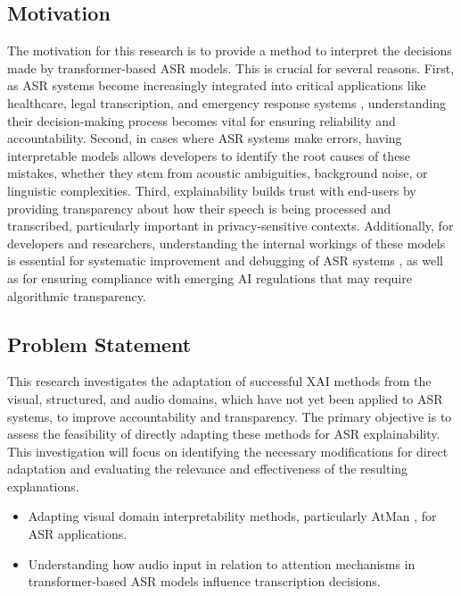 \documentclass[../report.tex]{subfiles}
\begin{document}
    \subsection{Motivation}
    \label{sec:introduction:motivation}

    The motivation for this research is to provide a method to interpret the decisions made by transformer-based ASR models. This is crucial for several reasons. First, as ASR systems become increasingly integrated into critical applications like healthcare, legal transcription, and emergency response systems \cite{doi:10.34133/icomputing.0074}, understanding their decision-making process becomes vital for ensuring reliability and accountability. Second, in cases where ASR systems make errors, having interpretable models allows developers to identify the root causes of these mistakes, whether they stem from acoustic ambiguities, background noise, or linguistic complexities. Third, explainability builds trust with end-users by providing transparency about how their speech is being processed and transcribed, particularly important in privacy-sensitive contexts. Additionally, for developers and researchers, understanding the internal workings of these models is essential for systematic improvement and debugging of ASR systems \cite{10143311}, as well as for ensuring compliance with emerging AI regulations that may require algorithmic transparency.

    \subsection{Problem Statement}
    \label{sec:introduction:problem_statement}

    This research investigates the adaptation of successful XAI methods from the visual, structured, and audio domains, which have not yet been applied to ASR systems, to improve accountability and transparency. The primary objective is to assess the feasibility of directly adapting these methods for ASR explainability. This investigation will focus on identifying the necessary modifications for direct adaptation and evaluating the relevance and effectiveness of the resulting explanations.
    \begin{itemize}
        \item Adapting visual domain interpretability methods, particularly AtMan \cite{NEURIPS2023_c83bc020}, for ASR applications.
        \item Understanding how audio input in relation to attention mechanisms in transformer-based ASR models influence transcription decisions.
    \end{itemize}
\end{document}

